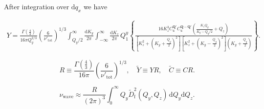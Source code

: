 \documentclass[prb,singlecolumn]{revtex4}
\begin{document}
After integration over $\mathrm{d}q_x$ we have

\begin{eqnarray}
  Y = \frac{\Gamma(\frac43)}{16\pi Q_y^{2/3}}\left(\frac6{\nu'_\mathrm{tot}}\right)^{1/3} \int_{Q_y/2}^\infty \frac{\mathrm{d}K_y}{2\pi} \int_{-\infty}^\infty \frac{\mathrm{d}K_z}{2\pi} \, Q_1^y 
  \left\{ \frac{16K_z^3 C_\mathrm{u}^{\mathbf{Q}'}C_\mathrm{u}^{\mathbf{Q-Q}'}  \left( \frac{K_z Q_y}{K_y - Q_y/2} + Q_z\right) }
  { \left[K_z^2 + \left(K_y+\frac{Q_y}2 \right)^2\right] \left[K_z^2 + \left(K_y - \frac{Q_y}2 \right)^2\right]\left(K_y +\frac{Q_y}2 \right) }  \right\} .\nonumber
\end{eqnarray}

$$ R \equiv \frac{\Gamma(\frac43)}{16\pi}\left(\frac6{\nu'_\mathrm{tot}}\right)^{1/3},\quad  \tilde{Y} \equiv YR,\quad \tilde{C} \equiv CR. $$

\begin{equation}
\nu_\mathrm{wave}  \approx\frac{R}{(2\pi)^3}\int_0^\infty Q_y \tilde{D}_\mathrm{f}^2(Q_y,Q_z)\,\mathrm{d}Q_y\mathrm{d}Q_z .
\end{equation}
\end{document}
